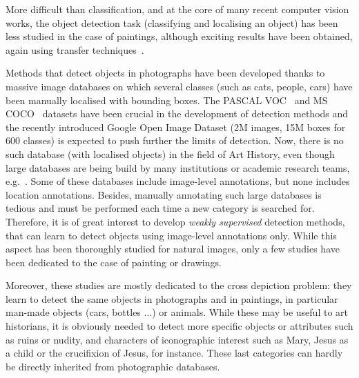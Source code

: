 \documentclass[runningheads]{llncs}
\begin{document}
More difficult than classification, and at the core of many recent computer vision works, the object detection task (classifying and localising an object) has been less studied in the case of paintings, although exciting results have been obtained, again using transfer techniques~\cite{crowley_art_2016,westlake_detecting_2016,inoue_crossdomain_2018}. 


Methods that detect objects in photographs have been developed thanks to massive image databases on which several classes (such as cats, people, cars) have been manually localised with bounding boxes. The PASCAL VOC~\cite{everingham_pascal_2007} and MS COCO~\cite{lin_microsoft_2014} datasets have been crucial in the development of detection methods and the recently introduced Google Open Image Dataset (2M images, 15M boxes for 600 classes) is expected to push further the limits of detection. Now, there is no such database (with localised objects) in the field of Art History, even though large databases are being build by many institutions or academic research teams, e.g.~\cite{rijksmuseum_online_2018,rmn_online,europeana_collections_2018,met_image_2018,pharosconsortium_pharos_2018,wilber_bam_2017}. Some of these databases include image-level annotations, but none includes location annotations. Besides, manually annotating such large databases is tedious and must be performed each time a new category is searched for. Therefore, it is of great interest to develop {\it weakly supervised} detection methods, that can learn to detect objects using image-level annotations only. While this aspect has been thoroughly studied for natural images, only a few studies have been dedicated to the case of painting or drawings.

Moreover, these studies are mostly dedicated to the cross depiction problem: they learn to detect the same objects in photographs and in paintings, in particular man-made objects (cars, bottles ...) or animals. While these may be useful to art historians, it is obviously needed to detect more specific objects or attributes such as ruins or nudity, and characters of iconographic interest such as Mary, Jesus as a child or the crucifixion of Jesus, for instance. These last categories can hardly be directly inherited from photographic databases. 
\end{document}
